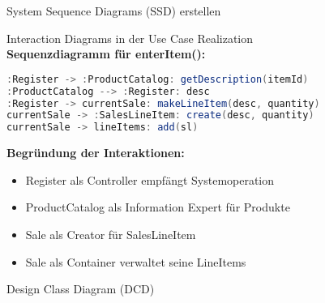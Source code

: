 \begin{KR}{System Sequence Diagrams (SSD) erstellen}
\end{KR}


\begin{example2}{Interaction Diagrams in der Use Case Realization}\\
\textbf{Sequenzdiagramm für enterItem():}

\begin{lstlisting}[language=Java, style=basesmol]
:Register -> :ProductCatalog: getDescription(itemId)
:ProductCatalog --> :Register: desc
:Register -> currentSale: makeLineItem(desc, quantity)
currentSale -> :SalesLineItem: create(desc, quantity)
currentSale -> lineItems: add(sl)
\end{lstlisting}

\textbf{Begründung der Interaktionen:}
\begin{itemize}
    \item Register als Controller empfängt Systemoperation
    \item ProductCatalog als Information Expert für Produkte
    \item Sale als Creator für SalesLineItem
    \item Sale als Container verwaltet seine LineItems
\end{itemize}
\end{example2}

\begin{concept}{Design Class Diagram (DCD)}
    
\end{concept}

